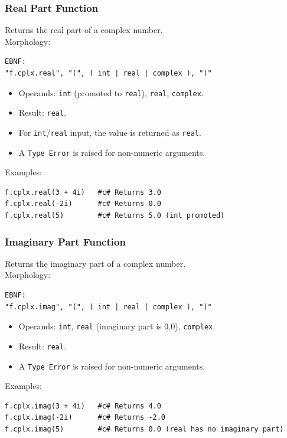 \subsubsection{Real Part Function}
Returns the real part of a complex number. \\
Morphology:
\begin{verbatim}
EBNF:
"f.cplx.real", "(", ( int | real | complex ), ")"
\end{verbatim}
\begin{itemize}
\item Operands: \texttt{int} (promoted to \texttt{real}), \texttt{real}, \texttt{complex}.
\item Result: \texttt{real}.
\item For \texttt{int}/\texttt{real} input, the value is returned as \texttt{real}.
\item A \texttt{Type Error} is raised for non-numeric arguments.
\end{itemize}
Examples:
\begin{verbatim}
f.cplx.real(3 + 4i)   #c# Returns 3.0
f.cplx.real(-2i)      #c# Returns 0.0
f.cplx.real(5)        #c# Returns 5.0 (int promoted)
\end{verbatim}

\subsubsection{Imaginary Part Function}
Returns the imaginary part of a complex number. \\
Morphology:
\begin{verbatim}
EBNF:
"f.cplx.imag", "(", ( int | real | complex ), ")"
\end{verbatim}
\begin{itemize}
\item Operands: \texttt{int}, \texttt{real} (imaginary part is 0.0), \texttt{complex}.
\item Result: \texttt{real}.
\item A \texttt{Type Error} is raised for non-numeric arguments.
\end{itemize}
Examples:
\begin{verbatim}
f.cplx.imag(3 + 4i)   #c# Returns 4.0
f.cplx.imag(-2i)      #c# Returns -2.0
f.cplx.imag(5)        #c# Returns 0.0 (real has no imaginary part)
\end{verbatim}

